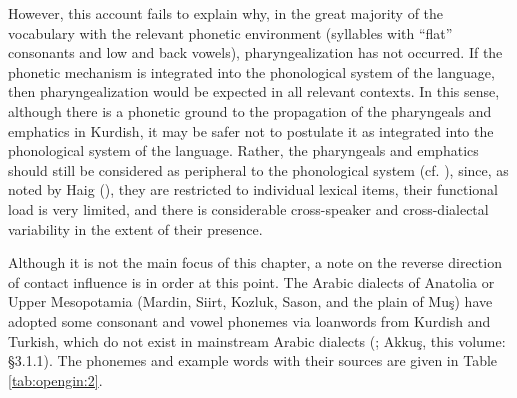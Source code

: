 \documentclass[output=paper]{langsci/langscibook}
\begin{document}
However, this account fails to explain why, in the great majority of the vocabulary with the relevant phonetic environment (syllables with “flat” consonants and low and back vowels), pharyngealization has not occurred. If the phonetic mechanism is integrated into the phonological system of the language, then pharyngealization would be expected in all relevant contexts. In this sense, although there is a phonetic ground to the propagation of the pharyngeals and emphatics in Kurdish, it may be safer not to postulate it as integrated into the phonological system of the language. Rather, the pharyngeals and emphatics should still be considered as peripheral to the phonological system (cf. \citealt{Haig2007,Anonbyforthcoming}), since, as noted by Haig (\citeyear[167]{Haig2007}), they are restricted to individual lexical items, their functional load is very limited, and there is considerable cross-speaker and cross-dialectal variability in the extent of their presence. 

Although it is not the main focus of this chapter, a note on the reverse direction of contact influence is in order at this point. The Arabic dialects of Anatolia or Upper Mesopotamia (Mardin, Siirt, Kozluk, Sason, and the plain of Muş) have adopted some consonant and vowel phonemes via loanwords from Kurdish and Turkish, which do not exist in mainstream Arabic dialects (\citealt[84]{Jastrow2011Kurdish}; Akkuş, this volume: §3.1.1). The phonemes and example words with their sources are given in Table \ref{tab:opengin:2}.
\end{document}
